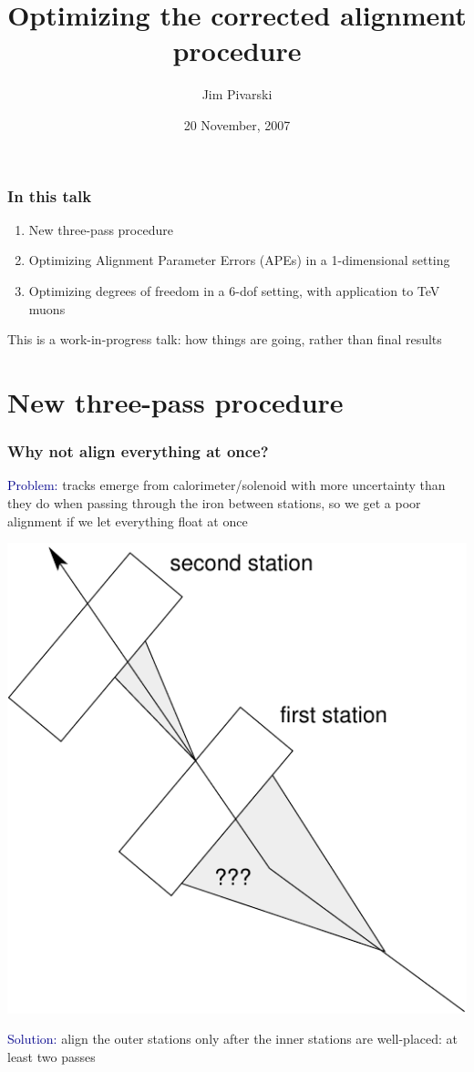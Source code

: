 \documentclass[compress]{beamer}
\title{Optimizing the corrected alignment procedure}
\author{Jim Pivarski}
\institute{Texas A\&M University}
\date{20 November, 2007}
\begin{document}
\frame{\titlepage}


\begin{frame}
\frametitle{In this talk}
\begin{enumerate}\setlength{\itemsep}{0.75 cm}
\item New three-pass procedure
\item Optimizing Alignment Parameter Errors (APEs) in a 1-dimensional setting
\item Optimizing degrees of freedom in a 6-dof setting, with application to TeV muons
\end{enumerate}

\vfill
This is a work-in-progress talk: how things are going, rather than final results
\end{frame}

\section*{New three-pass procedure}

\begin{frame}
\frametitle{Why not align everything at once?}

\textcolor{darkblue}{Problem:} tracks emerge from calorimeter/solenoid with more uncertainty
than they do when passing through the iron between stations, so
we get a poor alignment if we let everything float at once

\vspace{-0.35 cm}
\begin{center}
\includegraphics[width=0.35\linewidth]{problemsolution.pdf}
\end{center}

\vspace{-0.35 cm}
\textcolor{darkblue}{Solution:} align the outer stations only after
the inner stations are well-placed: at least two passes
\end{frame}
\end{document}
